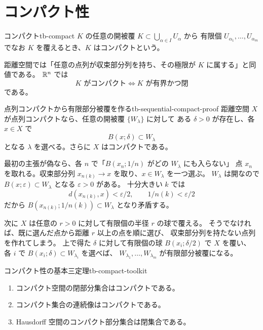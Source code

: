 \section{コンパクト性}

\begin{definition}{コンパクト}{tb-compact}
$K$ の任意の開被覆 $K\subset\bigcup_{\alpha\in I}U_\alpha$ から
有限個 $U_{\alpha_1},\ldots,U_{\alpha_m}$ でなお $K$ を覆えるとき、$K$ はコンパクトという。
\end{definition}

距離空間では「任意の点列が収束部分列を持ち、その極限が $K$ に属する」と同値である。
$\mathbb{R}^n$ では
\[
K\text{ がコンパクト}\Longleftrightarrow K\text{ が有界かつ閉}
\]
である。

\begin{proposition}{点列コンパクトから有限部分被覆を作る}{tb-sequential-compact-proof}
距離空間 $X$ が点列コンパクトなら、任意の開被覆 $\{W_\lambda\}$ に対して
ある $\delta>0$ が存在し、各 $x\in X$ で
\[
B(x;\delta)\subset W_\lambda
\]
となる $\lambda$ を選べる。さらに $X$ はコンパクトである。
\end{proposition}

最初の主張が偽なら、各 $n$ で「$B(x_n;1/n)$ がどの $W_\lambda$ にも入らない」
点 $x_n$ を取れる。収束部分列 $x_{n(k)}\to x$ を取り、$x\in W_\lambda$ を一つ選ぶ。
$W_\lambda$ は開なので $B(x;\varepsilon)\subset W_\lambda$ となる $\varepsilon>0$ がある。
十分大きい $k$ では
\[
d(x_{n(k)},x)<\varepsilon/2,\qquad 1/n(k)<\varepsilon/2
\]
だから $B(x_{n(k)};1/n(k))\subset W_\lambda$ となり矛盾する。

次に $X$ は任意の $r>0$ に対して有限個の半径 $r$ の球で覆える。
そうでなければ、既に選んだ点から距離 $r$ 以上の点を順に選び、
収束部分列を持たない点列を作れてしまう。
上で得た $\delta$ に対して有限個の球 $B(x_i;\delta/2)$ で $X$ を覆い、
各 $i$ で $B(x_i;\delta)\subset W_{\lambda_i}$ を選べば、
$W_{\lambda_1},\ldots,W_{\lambda_m}$ が有限部分被覆になる。

\begin{theorem}{コンパクト性の基本三定理}{tb-compact-toolkit}
\begin{enumerate}
  \item コンパクト空間の閉部分集合はコンパクトである。
  \item コンパクト集合の連続像はコンパクトである。
  \item Hausdorff 空間のコンパクト部分集合は閉集合である。
\end{enumerate}
\end{theorem}

